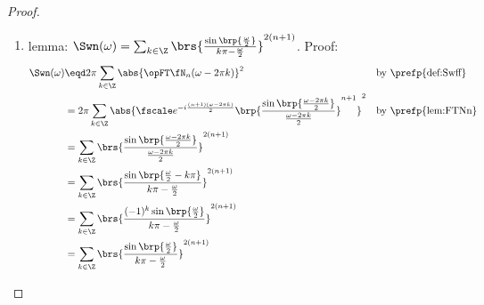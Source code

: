 \begin{proof}
\begin{enumerate}

  \item lemma: $\Swn(\omega)=\sum_{k\in\Z}\brs{\frac{\sin\brp{\frac{\omega}{2}}}{k\pi-\frac{\omega}{2}}}^{2(n+1)}$.
        Proof: \label{ilem:Nriesz_Geq}
        \begin{align*}
          \Swn(\omega)
            &\eqd 2\pi\sum_{k\in\Z}\abs{\opFT\fN_n(\omega-2\pi k)}^2
            && \text{by \prefp{def:Swff}}
          \\&= 2\pi\sum_{k\in\Z}\abs{\fscale e^{-i\frac{(n+1)(\omega-2\pi k)}{2}} \brp{\frac{\sin\brp{\frac{\omega-2\pi k}{2}}}{\frac{\omega-2\pi k}{2}}}^{n+1}}^2
            && \text{by \prefp{lem:FTNn}}
          \\&= \sum_{k\in\Z}\brs{\frac{\sin\brp{\frac{\omega-2\pi k}{2}}}{\frac{\omega-2\pi k}{2}}}^{2(n+1)}
          \\&= \sum_{k\in\Z}\brs{\frac{\sin\brp{\frac{\omega}{2}-k\pi}}
                                      {k\pi-\frac{\omega}{2}}}^{2(n+1)}
          \\&= \sum_{k\in\Z}\brs{\frac{(-1)^k\sin\brp{\frac{\omega}{2}}}
                                      {k\pi-\frac{\omega}{2}}}^{2(n+1)}
          \\&= \sum_{k\in\Z}\brs{\frac{\sin\brp{\frac{\omega}{2}}}
                                      {k\pi-\frac{\omega}{2}}}^{2(n+1)}
        \end{align*}



\end{enumerate}
\end{proof}
